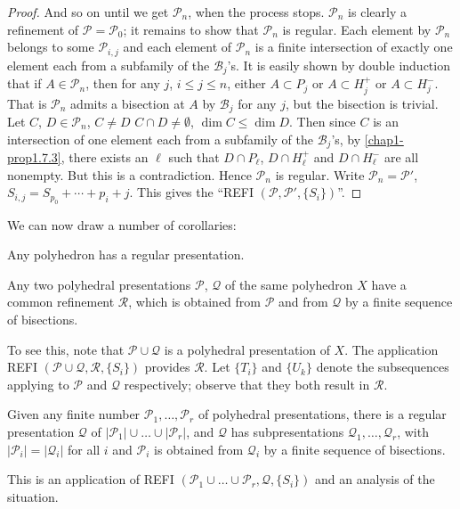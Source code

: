 \begin{proof}
And so on until we get $\mathscr{P}_{n}$, when the process stops. $\mathscr{P}_{n}$ is clearly a refinement of $\mathscr{P}=\mathscr{P}_{0}$; it remains to show that $\mathscr{P}_{n}$ is regular. Each element by $\mathscr{P}_{n}$ belongs to some $\mathscr{P}_{i,j}$ and each element of $\mathscr{P}_{n}$ is a finite intersection of exactly one element each from a subfamily of the $\mathscr{B}_{j}$'s. It is easily shown by double induction that if $A\in \mathscr{P}_{n}$, then for any $j$, $i\leq j\leq n$, either $A\subset P_{j}$ or $A\subset H^{+}_{j}$ or $A\subset H^{-}_{j}$. That is $\mathscr{P}_{n}$ admits a bisection at $A$ by $\mathscr{B}_{j}$ for any $j$, but the bisection is trivial. Let $C$, $D\in\mathscr{P}_{n}$, $C\neq D$ $C\cap  D\neq \emptyset$, $\dim C\leq \dim D$. Then since $C$ is an intersection of one element each from a subfamily of the $\mathscr{B}_{j}$'s, by 
\ref{chap1-prop1.7.3}, there exists an $\ell$ such that $D\cap P_{\ell}$, $D\cap H^{+}_{\ell}$ and $D\cap H^{-}_{\ell}$ are all nonempty. But this is a contradiction. Hence $\mathscr{P}_{n}$ is regular. Write $\mathscr{P}_{n}=\mathscr{P}'$,\pageoriginale $S_{i,j}=S_{p_{0}}+\cdots+p_{i}+j$. This gives the ``REFI $(\mathscr{P},\mathscr{P}',\{S_{i}\})$''.
\end{proof}

We can now draw a number of corollaries:

\begin{corollary}\label{chap1-coro1.10.4}
Any polyhedron has a regular presentation.
\end{corollary}

\begin{corollary}\label{chap1-coro1.10.5}
Any two polyhedral presentations $\mathscr{P}$, $\mathcal{Q}$ of the same polyhedron $X$ have a common refinement $\mathscr{R}$, which is obtained from $\mathscr{P}$ and from $\mathcal{Q}$ by a finite sequence of bisections.

To see this, note that $\mathscr{P}\cup \mathcal{Q}$ is a polyhedral presentation of $X$. The application REFI $(\mathscr{P}\cup \mathcal{Q},\mathscr{R},\{S_{i}\})$ provides $\mathscr{R}$. Let $\{T_{i}\}$ and $\{U_{k}\}$ denote the subsequences applying to $\mathscr{P}$ and $\mathcal{Q}$ respectively; observe that they both result in $\mathscr{R}$.
\end{corollary}


\begin{corollary}\label{chap1-coro1.10.6}
Given any finite number $\mathscr{P}_{1},\ldots,\mathscr{P}_{r}$ of polyhedral presentations, there is a regular presentation $\mathcal{Q}$ of $|\mathscr{P}_{1}|\cup\ldots\cup |\mathscr{P}_{r}|$, and $\mathcal{Q}$ has subpresentations $\mathcal{Q}_{1},\ldots,\mathcal{Q}_{r}$, with $|\mathscr{P}_{i}|=|\mathcal{Q}_{i}|$ for all $i$ and $\mathscr{P}_{i}$ is obtained from $\mathcal{Q}_{i}$ by a finite sequence of bisections.

This is an application of REFI $(\mathscr{P}_{1}\cup \ldots\cup \mathscr{P}_{r},\mathcal{Q},\{S_{i}\})$ and an analysis of the situation. 
\end{corollary}







